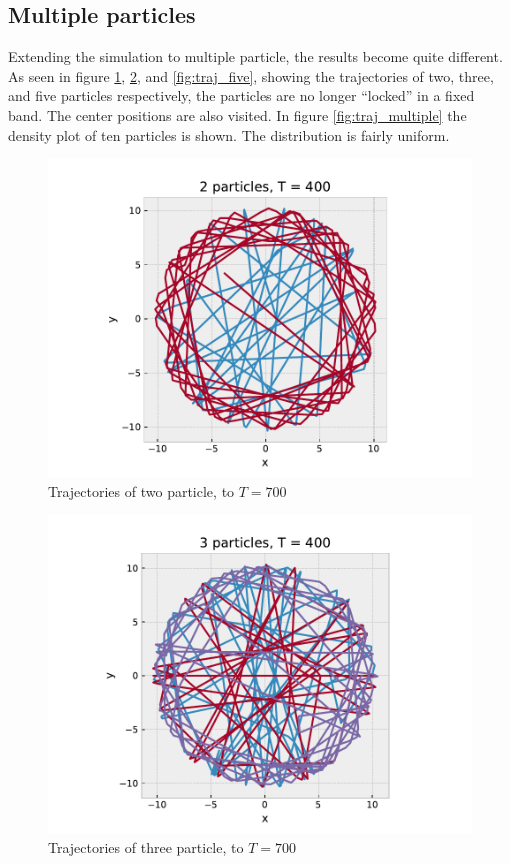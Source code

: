 \documentclass[a4paper,12pt]{article}
\begin{document}
\subsection{Multiple particles}
Extending the simulation to multiple particle, the results become quite different.
As seen in figure \ref{fig:traj_two}, \ref{fig:traj_three}, and \ref{fig:traj_five}, showing the trajectories of two, three, and five particles respectively, the particles are no longer ``locked'' in a fixed band.
The center positions are also visited.
In figure \ref{fig:traj_multiple} the density plot of ten particles is shown.
The distribution is fairly uniform.

\begin{figure}[hp]
  \centering
  \includegraphics[width=.75\textwidth]{media/trajectory_two_particles}
  \caption{Trajectories of two particle, to $T=700$\label{fig:traj_two}}
\end{figure}

\begin{figure}[hp]
  \centering
  \includegraphics[width=.75\textwidth]{media/trajectory_three_particles}
  \caption{Trajectories of three particle, to $T=700$\label{fig:traj_three}}
\end{figure}
\end{document}
